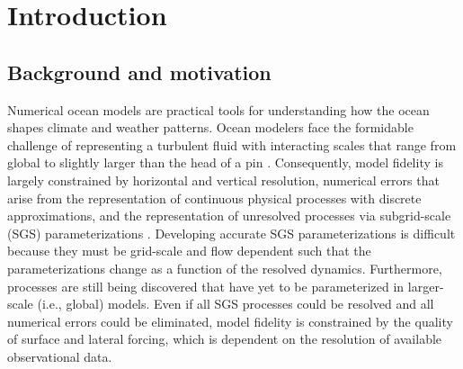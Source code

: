 

\chapter{Introduction}

\section{Background and motivation}
Numerical ocean models are practical tools for understanding how the ocean shapes climate and weather patterns. Ocean modelers face the formidable challenge of representing a turbulent fluid with interacting scales that range from global to slightly larger than the head of a pin \citep{ferrari2009ocean}. Consequently, model fidelity is largely constrained by horizontal and vertical resolution, numerical errors that arise from the representation of continuous physical processes with discrete approximations, and the representation of unresolved processes via subgrid-scale (SGS) parameterizations \citep{fox2019challenges}. Developing accurate SGS parameterizations is difficult because they must be grid-scale and flow dependent such that the parameterizations change as a function of the resolved dynamics. Furthermore, processes are still being discovered that have yet to be parameterized in larger-scale (i.e., global) models. Even if all SGS processes could be resolved and all numerical errors could be eliminated, model fidelity is constrained by the quality of surface and lateral forcing, which is dependent on the resolution of available observational data. 

